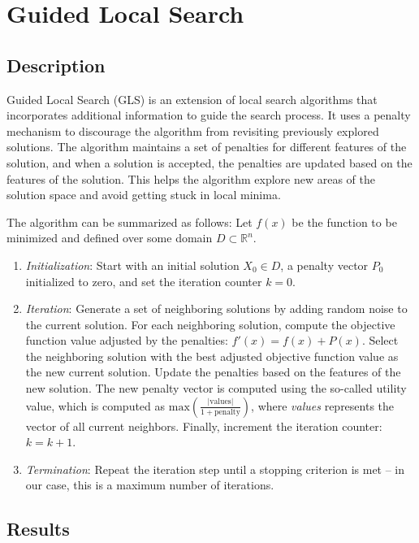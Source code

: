 \documentclass{article}
\begin{document}
\section{Guided Local Search}

\subsection{Description}

Guided Local Search (GLS) is an extension of local search algorithms
that incorporates additional information to guide the search process.
It uses a penalty mechanism to discourage the algorithm from revisiting
previously explored solutions. The algorithm maintains a set of
penalties for different features of the solution, and when a solution is
accepted, the penalties are updated based on the features of the
solution. This helps the algorithm explore new areas of the solution
space and avoid getting stuck in local minima.

The algorithm can be summarized as follows:
Let $f(x)$ be the function to be minimized and defined over some domain
$D \subset \mathbb{R}^n$.

\begin{enumerate}
  \item \textit{Initialization}: Start with an initial solution $X_0
    \in D$, a penalty vector $P_0$ initialized to zero, and set the
    iteration counter $k = 0$.
  \item \textit{Iteration}: Generate a set of neighboring solutions
    by adding random noise to the current solution. For each
    neighboring solution, compute the objective function value
    adjusted by the penalties: $f'(x) = f(x) + P(x)$. Select the
    neighboring solution with the best adjusted objective function
    value as the new current solution. Update the penalties based on
    the features of the new solution. The new penalty vector is
    computed using the so-called utility value, which is computed as
    $\text{max}\left( \frac{|\text{values}|}{1 + \text{penalty}}
    \right)$, where \textit{values} represents the vector of all
    current neighbors. Finally, increment the iteration counter: $k = k + 1$.
  \item \textit{Termination}: Repeat the iteration step until a
    stopping criterion is met -- in our case, this is a maximum
    number of iterations.
\end{enumerate}

\subsection{Results}
\end{document}
